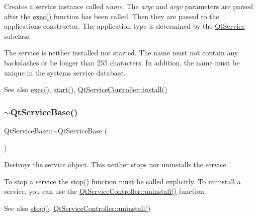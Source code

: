 Creates a service instance called {\itshape name}. The {\itshape argc} and {\itshape argv} parameters are parsed after the \hyperlink{class_qt_service_base_afae2e589de71c1ae3ae8db3dc9ab9c64}{exec()} function has been called. Then they are passed to the application\textquotesingle{}s constructor. The application type is determined by the \hyperlink{class_qt_service}{Qt\+Service} subclass.

The service is neither installed nor started. The name must not contain any backslashes or be longer than 255 characters. In addition, the name must be unique in the system\textquotesingle{}s service database.

\begin{DoxySeeAlso}{See also}
\hyperlink{class_qt_service_base_afae2e589de71c1ae3ae8db3dc9ab9c64}{exec()}, \hyperlink{class_qt_service_base_adbc0cd621b41bd3a6a1f62fda432e9e4}{start()}, \hyperlink{class_qt_service_controller_a7e2b85e911ff152557dd25959e76094b}{Qt\+Service\+Controller\+::install()} 
\end{DoxySeeAlso}
\mbox{\label{class_qt_service_base_a82c0872e5ed2448eff9eb6521f75bfd2}} 
\subsubsection{\texorpdfstring{$\sim$\+Qt\+Service\+Base()}{~QtServiceBase()}}
{\footnotesize\ttfamily Qt\+Service\+Base\+::$\sim$\+Qt\+Service\+Base (\begin{DoxyParamCaption}{ }\end{DoxyParamCaption})\hspace{0.3cm}{\ttfamily [virtual]}}

Destroys the service object. This neither stops nor uninstalls the service.

To stop a service the \hyperlink{class_qt_service_base_a8d52c1b8fd06b50bdc0a0c6f9936a68e}{stop()} function must be called explicitly. To uninstall a service, you can use the \hyperlink{class_qt_service_controller_a25cd2f1f6868ece5de77976eb55cb74c}{Qt\+Service\+Controller\+::uninstall()} function.

\begin{DoxySeeAlso}{See also}
\hyperlink{class_qt_service_base_a8d52c1b8fd06b50bdc0a0c6f9936a68e}{stop()}, \hyperlink{class_qt_service_controller_a25cd2f1f6868ece5de77976eb55cb74c}{Qt\+Service\+Controller\+::uninstall()} 
\end{DoxySeeAlso}


